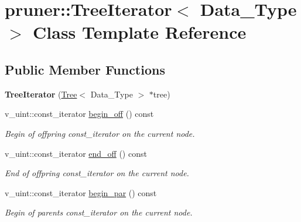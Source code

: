 \hypertarget{classpruner_1_1TreeIterator}{}\section{pruner\+:\+:Tree\+Iterator$<$ Data\+\_\+\+Type $>$ Class Template Reference}
\label{classpruner_1_1TreeIterator}
\subsection*{Public Member Functions}
\begin{DoxyCompactItemize}
\item 
\mbox{\label{classpruner_1_1TreeIterator_a9647a8457ecbaf874cfa2e31d7c991cb}} 
{\bfseries Tree\+Iterator} (\hyperlink{classpruner_1_1Tree}{Tree}$<$ Data\+\_\+\+Type $>$ $\ast$tree)
\item 
\mbox{\label{classpruner_1_1TreeIterator_a62f1df4b367b17878bbcb0a0b9f22d07}} 
v\+\_\+uint\+::const\+\_\+iterator \hyperlink{classpruner_1_1TreeIterator_a62f1df4b367b17878bbcb0a0b9f22d07}{begin\+\_\+off} () const
\begin{DoxyCompactList}\small\item\em Begin of offpring {\ttfamily const\+\_\+iterator} on the current node. \end{DoxyCompactList}\item 
\mbox{\label{classpruner_1_1TreeIterator_aecb961100ba67fd69ee7e3c9f0835e22}} 
v\+\_\+uint\+::const\+\_\+iterator \hyperlink{classpruner_1_1TreeIterator_aecb961100ba67fd69ee7e3c9f0835e22}{end\+\_\+off} () const
\begin{DoxyCompactList}\small\item\em End of offpring {\ttfamily const\+\_\+iterator} on the current node. \end{DoxyCompactList}\item 
\mbox{\label{classpruner_1_1TreeIterator_ad1435c13e19ed83e6222285753996567}} 
v\+\_\+uint\+::const\+\_\+iterator \hyperlink{classpruner_1_1TreeIterator_ad1435c13e19ed83e6222285753996567}{begin\+\_\+par} () const
\begin{DoxyCompactList}\small\item\em Begin of parents {\ttfamily const\+\_\+iterator} on the current node. \end{DoxyCompactList}\item 

\end{DoxyCompactItemize}
